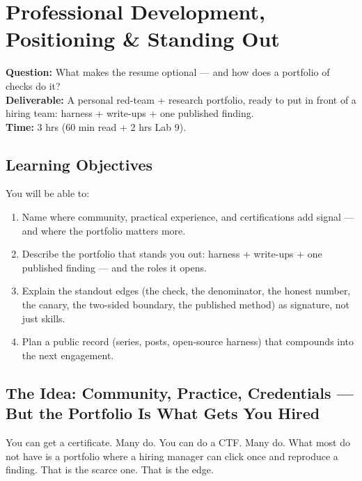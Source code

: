\chapter{Professional Development, Positioning \& Standing Out}
\label{ch:9}

\begin{tcolorbox}[colback=white,colframe=checkblack,title=Chapter 9 at a Glance,fonttitle=\bfseries,sharp corners,boxrule=1pt]
\textbf{Question:} What makes the resume optional — and how does a portfolio of checks do it?\\
\textbf{Deliverable:} A personal red-team + research portfolio, ready to put in front of a hiring team: harness + write-ups + one published finding.\\
\textbf{Time:} 3 hrs (60 min read + 2 hrs Lab 9).
\end{tcolorbox}

\section{Learning Objectives}
\fbadge
You will be able to:
\begin{enumerate}
\item Name where community, practical experience, and certifications add signal — and where the portfolio matters more.
\item Describe the portfolio that stands you out: harness + write-ups + one published finding — and the roles it opens.
\item Explain the standout edges (the check, the denominator, the honest number, the canary, the two-sided boundary, the published method) as signature, not just skills.
\item Plan a public record (series, posts, open-source harness) that compounds into the next engagement.
\end{enumerate}

\section{The Idea: Community, Practice, Credentials — But the Portfolio Is What Gets You Hired}
\tierF

You can get a certificate. Many do. You can do a CTF. Many do. What most do not have is a portfolio where a hiring manager can click once and reproduce a finding. That is the scarce one. That is the edge.


